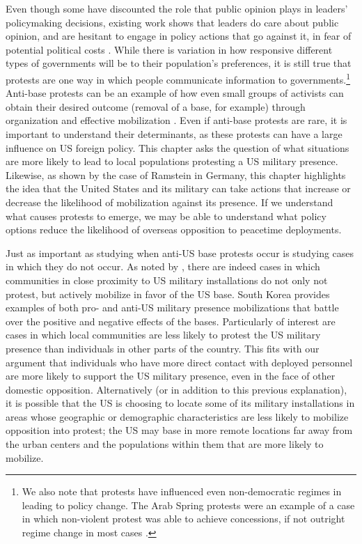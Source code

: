 Even though some have discounted the role that public opinion plays in leaders' policymaking decisions, existing work shows that leaders do care about public opinion, and are hesitant to engage in policy actions that go against it, in fear of potential political costs \cite{Tomz2018}. While there is variation in how responsive  different types of governments will be to their population's preferences, it is still true that protests are one way in which people communicate information to governments.\footnote{We also note that protests have influenced even non-democratic regimes in leading to policy change. The Arab Spring protests were an example of a case in which non-violent protest was able to achieve concessions, if not outright regime change in most cases \cite{Chenoweth2013}.} Anti-base protests can be an example of how even small groups of activists can obtain their desired outcome (removal of a base, for example) through organization and effective mobilization \cite{cooley2008}.  Even if anti-base protests are rare, it is important to understand their determinants, as these protests can have a large influence on US foreign policy.  This chapter asks the question of what situations are more likely to lead to local populations protesting a US military presence. Likewise, as shown by the case of Ramstein in Germany, this chapter highlights the idea that the United States and its military can take actions that increase or decrease the likelihood of mobilization against its presence. If we understand what causes protests to emerge, we may be able to understand what policy options reduce the likelihood of overseas opposition to peacetime deployments.  


Just as important as studying when anti-US base protests occur is studying cases in which they do not occur.  As noted by , there are indeed cases in which communities in close proximity to US military installations do not only not protest, but actively mobilize in favor of the US base. South Korea provides examples of both pro- and anti-US military presence mobilizations that battle over the positive and negative effects of the bases. Particularly of interest are cases in which local communities are less likely to protest the US military presence than individuals in other parts of the country.  This fits with our argument that individuals who have more direct contact  with deployed personnel are more likely to support the US military presence, even in the face of other domestic opposition.  Alternatively (or in addition to this previous explanation), it is possible that the US is choosing to locate some of its military installations in areas whose geographic or demographic characteristics are less likely to mobilize opposition into protest; the US may base in more remote locations far away from the urban centers and the populations within them that are more likely to mobilize. 


